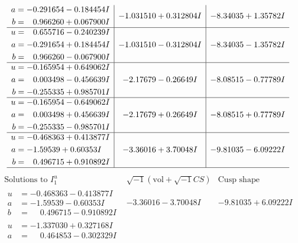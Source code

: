 \documentclass[1p]{elsarticle_modified}
\theoremstyle{definition}
\newcommand{\I}{\sqrt{-1}}
\begin{document}
$$\begin{array}{c|c|c}
\begin{aligned}
a &= -0.291654 - 0.184454 I \\
b &= \phantom{-}0.966260 + 0.067900 I\end{aligned}
 & -1.031510 + 0.312804 I & -8.34035 + 1.35782 I \\ \hline\begin{aligned}
u &= \phantom{-}0.655716 - 0.240239 I \\
a &= -0.291654 + 0.184454 I \\
b &= \phantom{-}0.966260 - 0.067900 I\end{aligned}
 & -1.031510 - 0.312804 I & -8.34035 - 1.35782 I \\ \hline\begin{aligned}
u &= -0.165954 + 0.649062 I \\
a &= \phantom{-}0.003498 - 0.456639 I \\
b &= -0.255335 + 0.985701 I\end{aligned}
 & -2.17679 - 0.26649 I & -8.08515 - 0.77789 I \\ \hline\begin{aligned}
u &= -0.165954 - 0.649062 I \\
a &= \phantom{-}0.003498 + 0.456639 I \\
b &= -0.255335 - 0.985701 I\end{aligned}
 & -2.17679 + 0.26649 I & -8.08515 + 0.77789 I \\ \hline\begin{aligned}
u &= -0.468363 + 0.413877 I \\
a &= -1.59539 + 0.60353 I \\
b &= \phantom{-}0.496715 + 0.910892 I\end{aligned}
 & -3.36016 + 3.70048 I & -9.81035 - 6.09222 I\\
 \hline 
 \end{array}$$\newpage$$\begin{array}{c|c|c}  
\text{Solutions to }I^u_{1}& \I (\text{vol} + \sqrt{-1}CS) & \text{Cusp shape}\\
 \hline 
\begin{aligned}
u &= -0.468363 - 0.413877 I \\
a &= -1.59539 - 0.60353 I \\
b &= \phantom{-}0.496715 - 0.910892 I\end{aligned}
 & -3.36016 - 3.70048 I & -9.81035 + 6.09222 I \\ \hline\begin{aligned}
u &= -1.337030 + 0.327168 I \\
a &= \phantom{-}0.464853 - 0.302329 I \\

\end{aligned}
\end{array}$$
\end{document}
